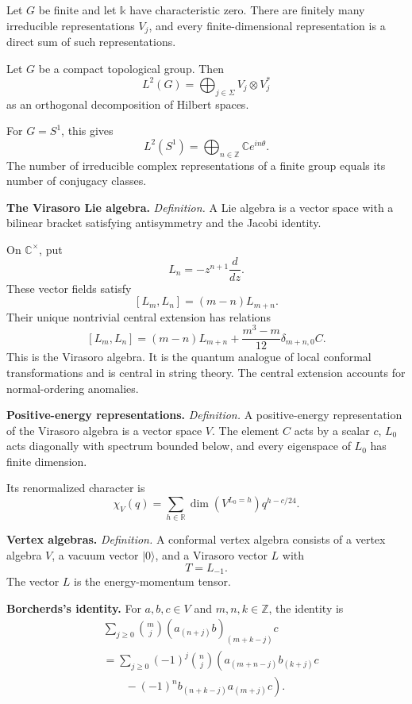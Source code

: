 \begin{theorem}
\label{theorem-finite-group-representations}
Let $G$ be finite and let $\mathbb{k}$ have
characteristic zero. There are finitely many
irreducible representations $V_j$, and every
finite-dimensional representation is a direct
sum of such representations.
\end{theorem}

\begin{theorem}
\label{theorem-peter-weyl}
Let $G$ be a compact topological group. Then
$$
L^2(G)=\bigoplus_{j\in\Sigma}
V_j\otimes V_j^*
$$
as an orthogonal decomposition of Hilbert
spaces.
\end{theorem}

For $G=S^1$, this gives
$$
L^2(S^1)=\bigoplus_{n\in\mathbb{Z}}
\mathbb{C}e^{in\theta}.
$$
The number of irreducible complex
representations of a finite group equals its
number of conjugacy classes.

\medskip\noindent
{\bf The Virasoro Lie algebra.}
{\it Definition.} A Lie algebra is a vector
space with a bilinear bracket satisfying
antisymmetry and the Jacobi identity.

On $\mathbb{C}^{\times}$, put
$$
L_n=-z^{n+1}\frac{d}{dz}.
$$
These vector fields satisfy
$$
[L_m,L_n]=(m-n)L_{m+n}.
$$
Their unique nontrivial central extension has
relations
$$
[L_m,L_n]=(m-n)L_{m+n}
+\frac{m^3-m}{12}\delta_{m+n,0}C.
$$
This is the Virasoro algebra. It is the
quantum analogue of local conformal
transformations and is central in string
theory. The central extension accounts for
normal-ordering anomalies.

\medskip\noindent
{\bf Positive-energy representations.}
{\it Definition.} A positive-energy
representation of the Virasoro algebra is a
vector space $V$. The element $C$ acts by a
scalar $c$, $L_0$ acts diagonally with
spectrum bounded below, and every eigenspace
of $L_0$ has
finite dimension.

Its renormalized character is
$$
\chi_V(q)=\sum_{h\in\mathbb{R}}
\dim(V^{L_0=h})q^{h-c/24}.
$$

\medskip\noindent
{\bf Vertex algebras.}
{\it Definition.} A conformal vertex algebra
consists of a vertex algebra $V$, a vacuum
vector $|0\rangle$, and a Virasoro vector $L$
with
$$
T=L_{-1}.
$$
The vector $L$ is the energy-momentum tensor.

\medskip\noindent
{\bf Borcherds's identity.}
For $a,b,c\in V$ and $m,n,k\in\mathbb{Z}$,
the identity is
$$
\begin{aligned}
&\sum_{j\geq0}\binom{m}{j}
(a_{(n+j)}b)_{(m+k-j)}c\\
&=\sum_{j\geq0}(-1)^j\binom{n}{j}
\left(a_{(m+n-j)}b_{(k+j)}c\right.\\
&\qquad\left.{}-(-1)^n
b_{(n+k-j)}a_{(m+j)}c\right).
\end{aligned}
$$


